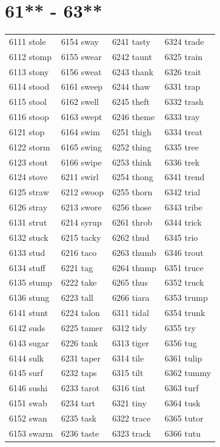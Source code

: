 \documentclass[12pt, oneside]{book}
\begin{document}
	\begin{table}[h]
		\centering
		\section*{61** - 63**}
		\begin{tabular}{l l l l}
			6111 stole & 6154 sway & 6241 tasty & 6324 trade\\
			6112 stomp & 6155 swear & 6242 taunt & 6325 train\\
			6113 stony & 6156 sweat & 6243 thank & 6326 trait\\
			6114 stood & 6161 sweep & 6244 thaw & 6331 trap\\
			6115 stool & 6162 swell & 6245 theft & 6332 trash\\
			6116 stoop & 6163 swept & 6246 theme & 6333 tray\\
			6121 stop & 6164 swim & 6251 thigh & 6334 treat\\
			6122 storm & 6165 swing & 6252 thing & 6335 tree\\
			6123 stout & 6166 swipe & 6253 think & 6336 trek\\
			6124 stove & 6211 swirl & 6254 thong & 6341 trend\\
			6125 straw & 6212 swoop & 6255 thorn & 6342 trial\\
			6126 stray & 6213 swore & 6256 those & 6343 tribe\\
			6131 strut & 6214 syrup & 6261 throb & 6344 trick\\
			6132 stuck & 6215 tacky & 6262 thud & 6345 trio\\
			6133 stud & 6216 taco & 6263 thumb & 6346 trout\\
			6134 stuff & 6221 tag & 6264 thump & 6351 truce\\
			6135 stump & 6222 take & 6265 thus & 6352 truck\\
			6136 stung & 6223 tall & 6266 tiara & 6353 trump\\
			6141 stunt & 6224 talon & 6311 tidal & 6354 trunk\\
			6142 suds & 6225 tamer & 6312 tidy & 6355 try\\
			6143 sugar & 6226 tank & 6313 tiger & 6356 tug\\
			6144 sulk & 6231 taper & 6314 tile & 6361 tulip\\
			6145 surf & 6232 taps & 6315 tilt & 6362 tummy\\
			6146 sushi & 6233 tarot & 6316 tint & 6363 turf\\
			6151 swab & 6234 tart & 6321 tiny & 6364 tusk\\
			6152 swan & 6235 task & 6322 trace & 6365 tutor\\
			6153 swarm & 6236 taste & 6323 track & 6366 tutu\\
		\end{tabular}
	\end{table}
	
\end{document}
